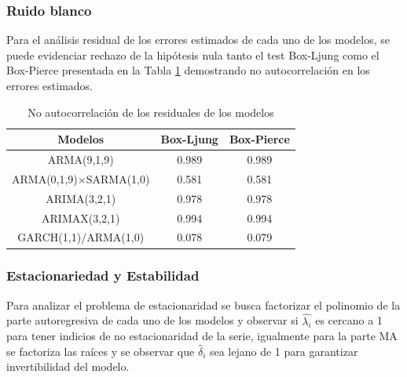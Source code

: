 \documentclass[conference]{IEEEtran}
\begin{document}
\subsubsection{Ruido blanco} Para el análisis residual de los errores estimados de cada uno de los modelos, se puede evidenciar rechazo de la hipótesis nula tanto el test Box-Ljung como el Box-Pierce presentada en la Tabla \ref{tab:tablaruidob} demostrando no autocorrelación en los errores estimados.
\begin{table}[H]
\centering
\caption{No autocorrelación de los residuales de los modelos }
\label{tab:tablaruidob}
\begin{tabular}{ccc}
\hline
\textbf{Modelos} & \textbf{Box-Ljung} & \textbf{Box-Pierce} \\ \hline
ARMA(9,1,9) & 0.989 & 0.989 \\
ARMA(0,1,9)$\times$SARMA(1,0) & 0.581 & 0.581 \\
ARIMA(3,2,1) & 0.978 & 0.978 \\
ARIMAX(3,2,1) & 0.994 & 0.994 \\
GARCH(1,1)/ARMA(1,0) & 0.078 & 0.079 \\ \hline
\end{tabular}
\end{table}

\subsubsection{Estacionariedad y Estabilidad} Para analizar el problema de estacionaridad se busca factorizar el polinomio de la parte autoregresiva de cada uno de los modelos y observar si $\hat{\lambda_{i}}$ es cercano a 1 para tener indicios de no estacionaridad de la serie, igualmente  para la parte MA se  factoriza las raíces y se observar que $\hat{\delta}_{i}$ sea lejano de 1 para garantizar invertibilidad del modelo.
\end{document}
